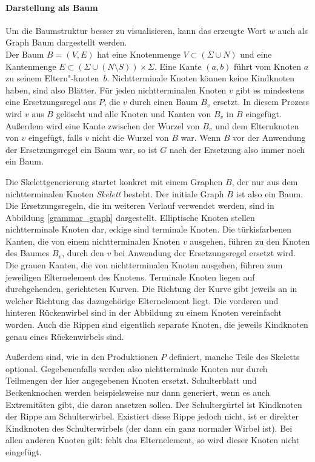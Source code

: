 \paragraph{Darstellung als Baum}
Um die Baumstruktur besser zu visualisieren, kann das erzeugte Wort $w$ auch als Graph \bzw Baum dargestellt werden.\\
Der Baum $B = (V, E)$ hat eine Knotenmenge $V \subset (\Sigma \cup N)$ und eine Kantenmenge $E \subset (\Sigma \cup (N \setminus S)) \times \Sigma$. Eine Kante $(a, b)$ führt vom Knoten $a$ zu seinem Eltern"-\mbox{knoten $b$}. Nichtterminale Knoten können keine Kindknoten haben, sind also Blätter. Für jeden nichtterminalen Knoten $v$ gibt es mindestens eine Ersetzungsregel aus $P$, die $v$ durch einen Baum $B_v$ ersetzt. In diesem Prozess wird $v$ aus $B$ gelöscht und alle Knoten und Kanten von $B_v$ in $B$ eingefügt. Außerdem wird eine Kante zwischen der Wurzel von $B_v$ und dem Elternknoten von $v$ eingefügt, falls $v$ nicht die Wurzel von $B$ war. Wenn $B$ vor der Anwendung der Ersetzungsregel ein Baum war, so ist $G$ nach der Ersetzung also immer noch ein Baum.

Die Skelettgenerierung startet konkret mit einem Graphen $B$, der nur aus dem nichtterminalen Knoten \emph{Skelett} besteht. Der initiale Graph $B$ ist also ein Baum.
Die Ersetzungsregeln, die im weiteren Verlauf verwendet werden, sind in Abbildung \ref{grammar_graph} dargestellt. 
Elliptische Knoten stellen nichtterminale Knoten dar, eckige sind terminale Knoten. Die türkisfarbenen Kanten, die von einem nichtterminalen Knoten $v$ ausgehen, führen zu den Knoten des Baumes $B_v$, durch den $v$ bei Anwendung der Ersetzungsregel ersetzt wird. Die grauen Kanten, die von nichtterminalen Knoten ausgehen, führen zum jeweiligen Elternelement des Knotens. Terminale Knoten liegen auf durchgehenden, gerichteten Kurven. Die Richtung der Kurve gibt jeweils an in welcher Richtung das dazugehörige Elternelement liegt.
Die vorderen und hinteren Rückenwirbel sind in der Abbildung zu einem Knoten vereinfacht worden. Auch die Rippen sind eigentlich separate Knoten, die jeweils Kindknoten genau eines Rückenwirbels sind.

Außerdem sind, wie in den Produktionen $P$ definiert, manche Teile des Skeletts optional. Gegebenenfalls werden also nichtterminale Knoten nur durch Teilmengen der hier angegebenen Knoten ersetzt. Schulterblatt und Beckenknochen werden beispielsweise nur dann generiert, wenn es auch Extremitäten gibt, die daran ansetzen sollen. Der Schultergürtel ist Kindknoten der Rippe am Schulterwirbel. Existiert diese Rippe jedoch nicht, ist er direkter Kindknoten des Schulterwirbels (der dann ein ganz normaler Wirbel ist). Bei allen anderen Knoten gilt: fehlt das Elternelement, so wird dieser Knoten nicht eingefügt.

